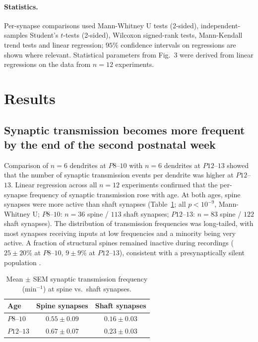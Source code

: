 \documentclass[11pt]{article}
\begin{document}
\paragraph{Statistics.} Per-synapse comparisons used Mann-Whitney U tests (2-sided), independent-samples Student's $t$-tests (2-sided), Wilcoxon signed-rank tests, Mann-Kendall trend tests \cite{mann2019kendall} and linear regression; $95\%$ confidence intervals on regressions are shown where relevant. Statistical parameters from Fig.~3 were derived from linear regressions on the data from $n = 12$ experiments.

\section{Results}

\subsection{Synaptic transmission becomes more frequent by the end of the second postnatal week}
Comparison of $n = 6$ dendrites at $P8$--$10$ with $n = 6$ dendrites at $P12$--$13$ showed that the number of synaptic transmission events per dendrite was higher at $P12$--$13$. Linear regression across all $n = 12$ experiments confirmed that the per-synapse frequency of synaptic transmission rose with age. At both ages, spine synapses were more active than shaft synapses (Table~\ref{tab:spineshaft}; all $p < 10^{-9}$, Mann-Whitney U; $P8$--$10$: $n = 36$ spine / $113$ shaft synapses; $P12$--$13$: $n = 83$ spine / $122$ shaft synapses). The distribution of transmission frequencies was long-tailed, with most synapses receiving inputs at low frequencies and a minority being very active. A fraction of structural spines remained inactive during recordings ($25 \pm 20\%$ at $P8$--$10$, $9 \pm 9\%$ at $P12$--$13$), consistent with a presynaptically silent population \cite{voronin2004silent}.

\begin{table}[h]
\centering
\caption{Mean $\pm$ SEM synaptic transmission frequency (min$^{-1}$) at spine vs.\ shaft synapses.}
\label{tab:spineshaft}
\begin{tabular}{lcc}
\toprule
Age & Spine synapses & Shaft synapses \\
\midrule
$P8$--$10$ & $0.55 \pm 0.09$ & $0.16 \pm 0.03$ \\
$P12$--$13$ & $0.67 \pm 0.07$ & $0.23 \pm 0.03$ \\
\bottomrule
\end{tabular}
\end{table}
\end{document}
